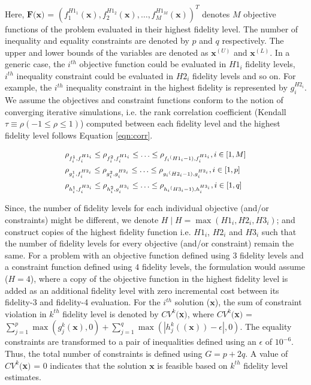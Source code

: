 \noindent Here, $\textbf{F(x)}$ = $(f^{H1_1}_1(\textbf{x}),f^{H1_2}_2(\textbf{x}),\ldots,f^{H1_M}_M(\textbf{x}))^T$ denotes $M$ objective functions of the problem evaluated in their highest fidelity level. The number of inequality and equality constraints are denoted by $p$ and $q$ respectively. The upper and lower bounds of the variables are denoted as $\textbf{x}^{(U)}$ and $\textbf{x}^{(L)}$. In a generic case, the $i^{th}$ objective function could be evaluated in $H1_i$ fidelity levels,  $i^{th}$ inequality constraint could be evaluated in $H2_i$ fidelity levels and so on. For example, the $i^{th}$ inequality constraint in the highest fidelity is represented by $g^{H2_i}_i$. We assume the objectives and constraint functions conform to  the notion of converging iterative simulations, i.e. the rank correlation coefficient (Kendall $\tau \equiv \rho (-1\le\rho\le 1)$) computed between each fidelity level and the highest fidelity level follows Equation \ref{eqn:corr}.

\begin{equation}\small
\begin{split}
&{\rho_{f^1_i,f^{H1_i}_i}} \le {\rho_{f^2_i,f^{H1_i}_i}} \le \ldots \le {\rho_{{f_i}^({H1_i}-1),f^{H1_i}_i}}, i\in\lbrack 1,M \rbrack \\
&{\rho_{g^1_i,f^{H2_i}_i}} \le {\rho_{g^2_i,g^{H2_i}_i}} \le \ldots \le {\rho_{{g_i}^({H2_i}-1),g^{H2_i}_i}}, i\in\lbrack 1,p \rbrack\\
&{\rho_{h^1_i,f^{H3_i}_i}} \le {\rho_{h^2_i,g^{H3_i}_i}} \le \ldots \le {\rho_{{h_i}^({H3_i}-1),h^{H3_i}_i}}, i\in\lbrack 1,q \rbrack\\
\label{eqn:corr}
\end{split}
\end{equation}

Since, the number of fidelity levels for each individual objective (and/or constraints) might be different, we denote $H \mid H = \max{(H1_i,H2_i,H3_i)}$; and construct copies of the highest fidelity function i.e. $H1_i$, $H2_i$ and $H3_i$ such that the number of fidelity levels for every objective (and/or constraint) remain the same. For a problem with an objective function defined using $3$ fidelity levels and a constraint function defined using $4$ fidelity levels, the formulation would assume ($H=4$), where a copy of the objective function in the highest fidelity level is added as an additional fidelity level with zero incremental cost between its fidelity-3 and fidelity-4 evaluation. For the $i^{th}$ solution ($\textbf{x}$), the sum of constraint violation in $k^{th}$ fidelity level is denoted by $CV^k($\textbf{x}$)$, where $CV^k($\textbf{x}$)$ = $\sum_{j = 1}^p \max{(g^k_j(\textbf{x}),0)} + \sum_{j = 1}^q \max{(|h^k_j((\textbf{x}))-\epsilon|,0)}$. The equality constraints are transformed to a pair of inequalities defined using an $\epsilon$ of $10^{-6}$. Thus, the total number of constraints is defined using $G = p+2q$. A value of $CV^k($\textbf{x}$)$ = $0$ indicates that the solution $\textbf{x}$ is feasible based on $k^{th}$ fidelity level estimates. 

